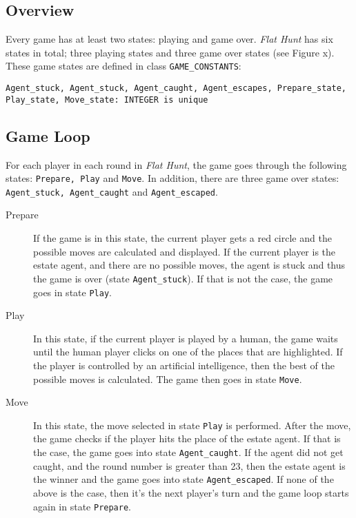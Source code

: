 \subsection{Overview}

Every game has at least two states: playing and game over. \emph{Flat Hunt} has six states in total; three playing states and three game over states (see Figure x). These game states are defined in class \texttt{GAME\_CONSTANTS}:

\texttt{Agent\_stuck, Agent\_stuck, Agent\_caught, Agent\_escapes, Prepare\_state, Play\_state, Move\_state: INTEGER is unique}

\subsection{Game Loop}
For each player in each round in \emph{Flat Hunt}, the game goes through the following states: \texttt{Prepare, Play} and \texttt{Move}. In addition, there are three game over states: \texttt{Agent\_stuck, Agent\_caught} and \texttt{Agent\_escaped}.

\begin{description}
    
  \item[Prepare] If the game is in this state, the current player gets a red circle and the possible moves are calculated and displayed. If the current player is the estate agent, and there are no possible moves, the agent is stuck and thus the game is over (state \texttt{Agent\_stuck}). If that is not the case, the game goes in state \texttt{Play}.
  
  \item[Play] In this state, if the current player is played by a human, the game waits until the human player clicks on one of the places that are highlighted. If the player is controlled by an artificial intelligence, then the best of the possible moves is calculated. The game then goes in state \texttt{Move}.
  
  \item[Move] In this state, the move selected in state \texttt{Play} is performed. After the move, the game checks if the player hits the place of the estate agent. If that is the case, the game goes into state \texttt{Agent\_caught}. If the agent did not get caught, and the round number is greater than 23, then the estate agent is the winner and the game goes into state \texttt{Agent\_escaped}. If none of the above is the case, then it's the next player's turn and the game loop starts again in state \texttt{Prepare}.

\end{description}

